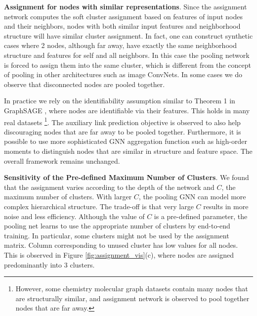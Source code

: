 \documentclass{article}
\newcommand{\jure}[1]{{{\textcolor{red}{[Jure: #1]}}}}
\newcommand{\xhdr}[1]{{\noindent\bfseries #1}.}
\newcommand{\name}{\textsc{DiffPool}\xspace}
\newcommand{\cut}[1]{}
\begin{document}
\xhdr{Assignment for nodes with similar representations}
Since the assignment network computes the soft cluster assignment based on features of input nodes and their neighbors, nodes with both similar input features and neighborhood structure will have similar cluster assignment.
In fact, one can construct synthetic cases where 2 nodes, although far away, have exactly the same neighborhood structure and features for self and all neighbors. In this case the pooling network is forced to assign them into the same cluster, which is different from the concept of pooling in other architectures such as image ConvNets. In some cases we do observe that disconnected nodes are pooled together.

In practice we rely on the identifiability assumption similar to Theorem 1 in GraphSAGE \cite{hamilton2017inductive}, where nodes are identifiable via their features. This holds in many real datasets \footnote{However, some chemistry molecular graph datasets contain many nodes that are structurally similar, and assignment network is observed to pool together nodes that are far away.}. 
The auxiliary link prediction objective is observed to also help discouraging nodes that are far away to be pooled together. Furthermore, it is possible to use more sophisticated GNN aggregation function such as high-order moments \cite{verma2018graph} to distinguish nodes that are similar in structure and feature space. The overall framework remains unchanged.

\xhdr{Sensitivity of the Pre-defined Maximum Number of Clusters}
We found that the assignment varies according to the depth of the network and $C$, the maximum number of clusters. With larger $C$, the pooling GNN can model more complex hierarchical structure. The trade-off is that very large $C$ results in more noise and less efficiency. 
Although the value of $C$ is a pre-defined parameter, the pooling net learns to use the appropriate number of clusters by end-to-end training. 
In particular, some clusters might not be used by the assignment matrix. Column corresponding to unused cluster has low values for all nodes. This is observed in Figure \ref{fig:assignment_vis}(c), where nodes are assigned predominantly into 3 clusters.


\cut{
\xhdr{Number of clusters} \jure{why is this in experiments? We can cut this or make it into an experimental result.}
In addithttps://v2.overleaf.com/projection, although we globally set the number of clusters to be $25\%$ of the nodes, the assignment network automatically learns the appropriate number of meaningful clusters to assign for different graphs in the dataset, in order to optimize the classification objective.
\cut{
\begin{figure}[ht!]
    \centering
    \texttt{[image: figs/diffpool\_vis.pdf]}
    \caption{Visualization of hierarchical cluster assignment over two \name\ layers, using an example graph from \textsc{Collab}.
      Nodes in the right-hand side plot correspond to cluster in the original graph (left-hand side). Colors are used to connect the nodes/clusters across the graphs, and dotted lines are used to indicate clusters.}
    \label{fig:assignment_vis}
\end{figure}
}
}
\end{document}
